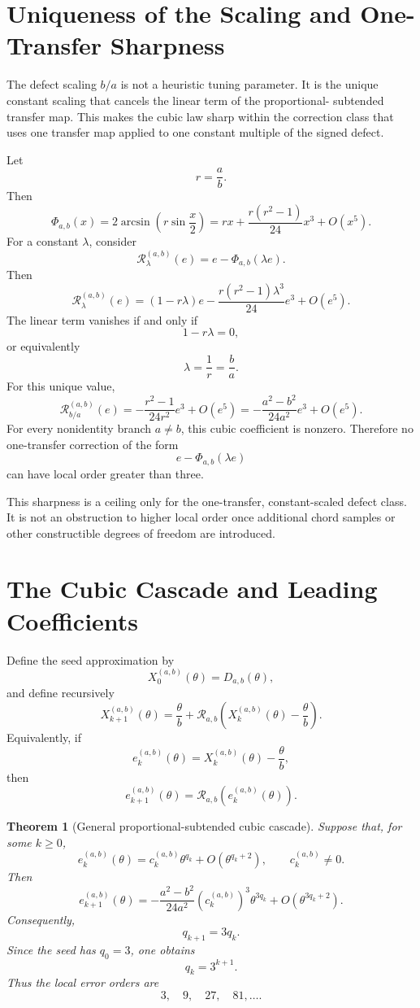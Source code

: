 \documentclass[11pt]{article}
\newtheorem{theorem}{Theorem}[section]
\theoremstyle{definition}
\theoremstyle{remark}
\newcommand{\Rop}{\mathscr{R}}
\newcommand{\Phiop}{\Phi}
\begin{document}
\section{Uniqueness of the Scaling and One-Transfer Sharpness}
\label{sec:sharpness}

The defect scaling $b/a$ is not a heuristic tuning parameter.  It is the
unique constant scaling that cancels the linear term of the proportional-
subtended transfer map.  This makes the cubic law sharp within the correction
class that uses one transfer map applied to one constant multiple of the signed
defect.

Let
\[
r=\frac{a}{b}.
\]
Then
\[
\Phiop_{a,b}(x)
=
2\arcsin\!\left(r\sin\frac{x}{2}\right)
=
rx+
\frac{r(r^2-1)}{24}x^3
+
O(x^5).
\]
For a constant $\lambda$, consider
\[
\Rop^{(a,b)}_{\lambda}(e)
=
e-
\Phiop_{a,b}(\lambda e).
\]
Then
\[
\Rop^{(a,b)}_{\lambda}(e)
=
(1-r\lambda)e
-
\frac{r(r^2-1)\lambda^3}{24}e^3
+
O(e^5).
\]
The linear term vanishes if and only if
\[
1-r\lambda=0,
\]
or equivalently
\[
\lambda=\frac{1}{r}=\frac{b}{a}.
\]
For this unique value,
\[
\Rop^{(a,b)}_{b/a}(e)
=
-
\frac{r^2-1}{24r^2}e^3
+
O(e^5)
=
-
\frac{a^2-b^2}{24a^2}e^3
+
O(e^5).
\]
For every nonidentity branch $a\ne b$, this cubic coefficient is nonzero.
Therefore no one-transfer correction of the form
\[
e-
\Phiop_{a,b}(\lambda e)
\]
can have local order greater than three.

This sharpness is a ceiling only for the one-transfer, constant-scaled defect
class.  It is not an obstruction to higher local order once additional chord
samples or other constructible degrees of freedom are introduced.

\section{The Cubic Cascade and Leading Coefficients}
\label{sec:cubic-cascade}

Define the seed approximation by
\[
X^{(a,b)}_0(\theta)=D_{a,b}(\theta),
\]
and define recursively
\[
X^{(a,b)}_{k+1}(\theta)
=
\frac{\theta}{b}
+
\Rop_{a,b}\!\left(
X^{(a,b)}_k(\theta)-\frac{\theta}{b}
\right).
\]
Equivalently, if
\[
e^{(a,b)}_k(\theta)
=
X^{(a,b)}_k(\theta)-\frac{\theta}{b},
\]
then
\[
e^{(a,b)}_{k+1}(\theta)
=
\Rop_{a,b}\!\left(e^{(a,b)}_k(\theta)\right).
\]

\begin{theorem}[General proportional-subtended cubic cascade]
\label{thm:general-cubic-cascade}
Suppose that, for some $k\ge 0$,
\[
e^{(a,b)}_k(\theta)
=
c^{(a,b)}_k\theta^{q_k}
+
O(\theta^{q_k+2}),
\qquad
c^{(a,b)}_k\ne 0.
\]
Then
\[
e^{(a,b)}_{k+1}(\theta)
=
-
\frac{a^2-b^2}{24a^2}
\left(c^{(a,b)}_k\right)^3
\theta^{3q_k}
+
O(\theta^{3q_k+2}).
\]
Consequently,
\[
q_{k+1}=3q_k.
\]
Since the seed has $q_0=3$, one obtains
\[
q_k=3^{k+1}.
\]
Thus the local error orders are
\[
3,\quad 9,\quad 27,\quad 81,\ldots .
\]
\end{theorem}
\end{document}
